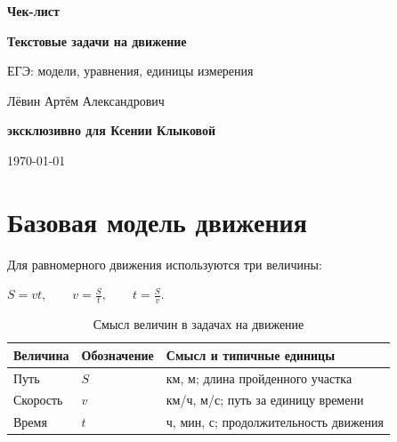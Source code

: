 \documentclass[a4paper,12pt]{article}
\newcommand{\formula}[1]{%
  \begin{center}
    \large\color{darkaccent}\ensuremath{#1}
  \end{center}
}
\begin{document}
\begin{titlepage}
  \thispagestyle{empty}
  \centering
  \vspace*{2.8cm}

  {\Huge\bfseries\color{darkaccent}Чек-лист\par}
  \vspace{0.6cm}

  {\Huge\bfseries Текстовые задачи на движение\par}
  \vspace{0.45cm}

  {\Large\color{textgray}
    ЕГЭ: модели, уравнения, единицы измерения\par
  }

  \vfill

  {\large Лёвин Артём Александрович\par}
  \vspace{0.2cm}

  {\large\bfseries эксклюзивно для Ксении Клыковой\par}
  \vspace{0.8cm}

  {\large \today\par}

\end{titlepage}

\section{Базовая модель движения}

Для равномерного движения используются три величины:
\formula{
  S=vt,
  \qquad
  v=\frac{S}{t},
  \qquad
  t=\frac{S}{v}.
}

\begin{table}[ht]
\centering
\caption{Смысл величин в задачах на движение}
\begin{tabularx}{\linewidth}{@{}l l X@{}}
\toprule
Величина & Обозначение & Смысл и типичные единицы \\
\midrule
Путь & $S$ & км, м; длина пройденного участка \\
Скорость & $v$ & км/ч, м/с; путь за единицу времени \\
Время & $t$ & ч, мин, с; продолжительность движения \\
\bottomrule
\end{tabularx}
\end{table}
\end{document}
